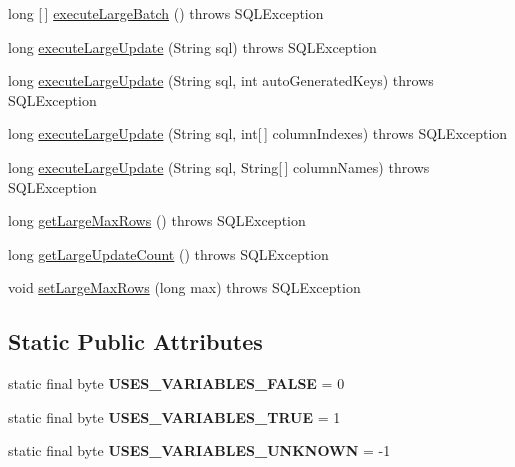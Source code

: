 \begin{DoxyCompactItemize}
long \mbox{[}$\,$\mbox{]} \mbox{\hyperlink{classcom_1_1mysql_1_1jdbc_1_1_statement_impl_a2695076e6a2e3088b8da220e7a2f89d7}{execute\+Large\+Batch}} ()  throws S\+Q\+L\+Exception 
\item 
long \mbox{\hyperlink{classcom_1_1mysql_1_1jdbc_1_1_statement_impl_a5419f848505968483a4ce341ee408877}{execute\+Large\+Update}} (String sql)  throws S\+Q\+L\+Exception 
\item 
long \mbox{\hyperlink{classcom_1_1mysql_1_1jdbc_1_1_statement_impl_a314534ca8391965ccfcc15a656ea17c2}{execute\+Large\+Update}} (String sql, int auto\+Generated\+Keys)  throws S\+Q\+L\+Exception 
\item 
long \mbox{\hyperlink{classcom_1_1mysql_1_1jdbc_1_1_statement_impl_afc5fbce4be94a79867778d9f1c0e20bb}{execute\+Large\+Update}} (String sql, int\mbox{[}$\,$\mbox{]} column\+Indexes)  throws S\+Q\+L\+Exception 
\item 
long \mbox{\hyperlink{classcom_1_1mysql_1_1jdbc_1_1_statement_impl_ac15cba5e08e73a6022b347ed5427dd68}{execute\+Large\+Update}} (String sql, String\mbox{[}$\,$\mbox{]} column\+Names)  throws S\+Q\+L\+Exception 
\item 
long \mbox{\hyperlink{classcom_1_1mysql_1_1jdbc_1_1_statement_impl_a389a39b21dfb359636a9124ae91d6b86}{get\+Large\+Max\+Rows}} ()  throws S\+Q\+L\+Exception 
\item 
long \mbox{\hyperlink{classcom_1_1mysql_1_1jdbc_1_1_statement_impl_a49c1971a757125e970b073a7b7295a14}{get\+Large\+Update\+Count}} ()  throws S\+Q\+L\+Exception 
\item 
void \mbox{\hyperlink{classcom_1_1mysql_1_1jdbc_1_1_statement_impl_a273589250c52af54dac911d1cfcfd87d}{set\+Large\+Max\+Rows}} (long max)  throws S\+Q\+L\+Exception 
\end{DoxyCompactItemize}
\subsection*{Static Public Attributes}
\begin{DoxyCompactItemize}
\item 
\mbox{\label{classcom_1_1mysql_1_1jdbc_1_1_statement_impl_a49632fc977f07f8266bb5669da23d729}} 
static final byte {\bfseries U\+S\+E\+S\+\_\+\+V\+A\+R\+I\+A\+B\+L\+E\+S\+\_\+\+F\+A\+L\+SE} = 0
\item 
\mbox{\label{classcom_1_1mysql_1_1jdbc_1_1_statement_impl_ac5bb4f49786faab4175bbca630a80821}} 
static final byte {\bfseries U\+S\+E\+S\+\_\+\+V\+A\+R\+I\+A\+B\+L\+E\+S\+\_\+\+T\+R\+UE} = 1
\item 
\mbox{\label{classcom_1_1mysql_1_1jdbc_1_1_statement_impl_af8e95849f078aef76940819be50d1fda}} 
static final byte {\bfseries U\+S\+E\+S\+\_\+\+V\+A\+R\+I\+A\+B\+L\+E\+S\+\_\+\+U\+N\+K\+N\+O\+WN} = -\/1
\end{DoxyCompactItemize}
